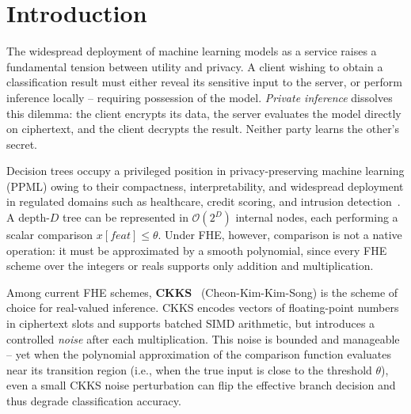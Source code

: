 \documentclass[runningheads]{llncs}
\begin{document}

\section{Introduction}
\label{sec:intro}

The widespread deployment of machine learning models as a service raises a
fundamental tension between utility and privacy.  A client wishing to obtain
a classification result must either reveal its sensitive input to the server,
or perform inference locally -- requiring possession of the model.
\emph{Private inference} dissolves this dilemma: the client encrypts its
data, the server evaluates the model directly on ciphertext, and the client
decrypts the result.  Neither party learns the other's secret.

Decision trees occupy a privileged position in privacy-preserving machine
learning (PPML) owing to their compactness, interpretability, and widespread
deployment in regulated domains such as healthcare, credit scoring, and
intrusion detection~\cite{bos2014private,tai2017mining}.  A depth-$D$ tree
can be represented in $\mathcal{O}(2^D)$ internal nodes, each performing a
scalar comparison $x[\mathit{feat}] \leq \theta$.  Under FHE, however,
comparison is not a native operation: it must be approximated by a smooth
polynomial, since every FHE scheme over the integers or reals supports only
addition and multiplication.

Among current FHE schemes, \textbf{CKKS}~\cite{cheon2017homomorphic}
(Cheon-Kim-Kim-Song) is the scheme of choice for real-valued inference.
CKKS encodes vectors of floating-point numbers in ciphertext slots and
supports batched SIMD arithmetic, but introduces a controlled \emph{noise}
after each multiplication.  This noise is bounded and manageable -- yet when
the polynomial approximation of the comparison function evaluates near its
transition region (i.e., when the true input is close to the threshold
$\theta$), even a small CKKS noise perturbation can flip the effective
branch decision and thus degrade classification accuracy.
\end{document}
